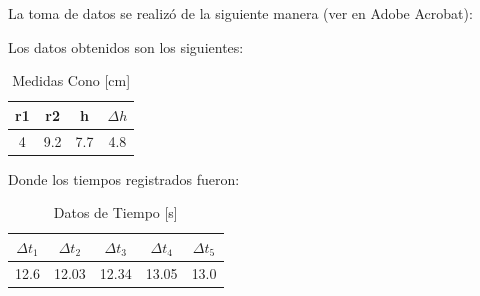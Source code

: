 La toma de datos se realizó de la siguiente manera (ver en Adobe Acrobat):

\begin{center}
\end{center}

\newpage
Los datos obtenidos son los siguientes:

\begin{table}[H]
    \centering
    \begin{tabular}{|c|c|c|c|}
    \hline
    r1 & r2 & h & $\Delta h$ \\ \hline
    4 & 9.2 & 7.7 & 4.8 \\ \hline
    \end{tabular}
    \caption{Medidas Cono [cm]}
    \label{tab:permeabilidad}
\end{table}

Donde los tiempos registrados fueron:

\begin{table}[H]
    \centering
    \begin{tabular}{|c|c|c|c|c|}
    \hline
    $\Delta t_1$ & $\Delta t_2$ & $\Delta t_3$ & $\Delta t_4$ & $\Delta t_5$ \\ \hline
    12.6 & 12.03 & 12.34 & 13.05 & 13.0 \\ \hline
    \end{tabular}
    \caption{Datos de Tiempo [s]}
    \label{tab:tiempos}
\end{table}

